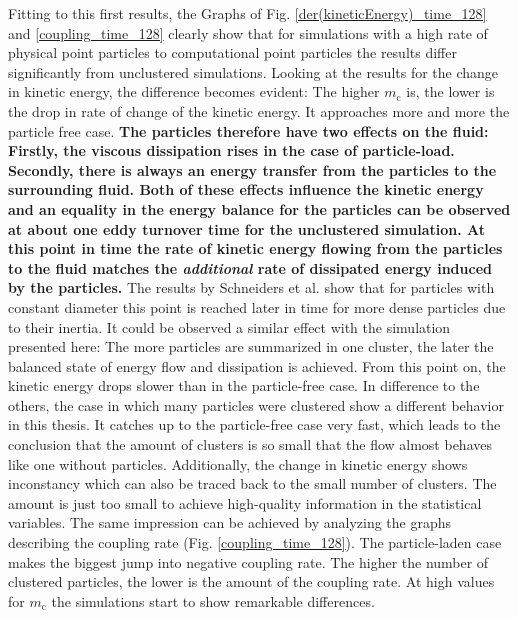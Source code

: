 \documentclass[11pt,a4paper,openany,oneside,parskip=half*]{article}
\begin{document}
\newline
Fitting to this first results, the Graphs of Fig. \ref{der(kineticEnergy)_time_128} and \ref{coupling_time_128} clearly show that for simulations with a high rate of physical point particles to computational point particles the results differ significantly from unclustered simulations. Looking at the results for the change in kinetic energy, the difference becomes evident: The higher $ m_\mathrm{c} $ is, the lower is the drop in rate of change of the kinetic energy. It approaches more and more the particle free case. 
\newline
\textbf{The particles therefore have two effects on the fluid: Firstly, the viscous dissipation rises in the case of particle-load. Secondly, there is always an energy transfer from the particles to the surrounding fluid. Both of these effects influence the kinetic energy and an equality in the energy balance for the particles can be observed at about one eddy turnover time for the unclustered simulation. At this point in time the rate of kinetic energy flowing from the particles to the fluid matches the \textit{additional} rate of dissipated energy induced by the particles.}
\newline
The results by Schneiders et al. \cite{Schneiders2017} show that for particles with constant diameter this point is reached later in time for more dense particles due to their inertia. It could be observed a similar effect with the simulation presented here: The more particles are summarized in one cluster, the later the balanced state of energy flow and dissipation is achieved. From this point on, the kinetic energy drops slower than in the particle-free case.
\newline
In difference to the others, the case in which many particles were clustered show a different behavior in this thesis. It catches up to the particle-free case very fast, which leads to the conclusion that the amount of clusters is so small that the flow almost behaves like one without particles. Additionally, the change in kinetic energy shows inconstancy which can also be traced back to the small number of clusters. The amount is just too small to achieve high-quality information in the statistical variables. 
\newline
The same impression can be achieved by analyzing the graphs describing the coupling rate (Fig. \ref{coupling_time_128}). The particle-laden case makes the biggest jump into negative coupling rate. The higher the number of clustered particles, the lower is the amount of the coupling rate. At high values for $m_\mathrm{c}$ the simulations start to show remarkable differences. 
\end{document}
